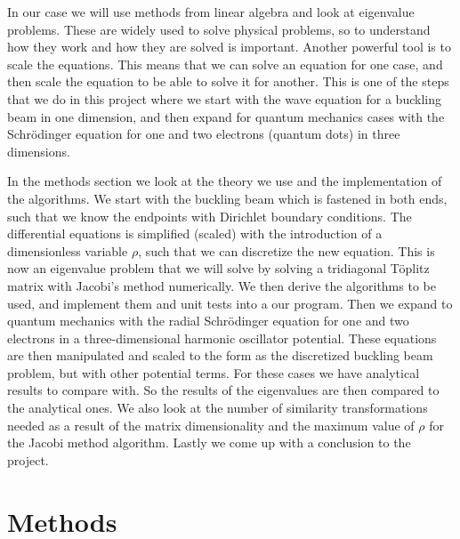 \documentclass[12pt,a4paper,english]{article}
\begin{document}
In our case we will use methods from linear algebra and look at eigenvalue problems. These are widely used to solve physical problems, so to understand how they work and how they are solved is important. Another powerful tool is to scale the equations. This means that we can solve an equation for one case, and then scale the equation to be able to solve it for another. This is one of the steps that we do in this project where we start with the wave equation for a buckling beam in one dimension, and then expand for quantum mechanics cases with the Schrödinger equation for one and two electrons (quantum dots) in three dimensions.

In the methods section we look at the theory we use and the implementation of the algorithms. We start with the buckling beam which is fastened in both ends, such that we know the endpoints with Dirichlet boundary conditions. The differential equations is simplified (scaled) with the introduction of a dimensionless variable $\rho$, such that we can discretize the new equation. This is now an eigenvalue problem that we will solve by solving a tridiagonal Töplitz matrix with Jacobi's method numerically. We then derive the algorithms to be used, and implement them and unit tests into a our program. Then we expand to quantum mechanics with the radial Schrödinger equation for one and two electrons in a three-dimensional harmonic oscillator potential. These equations are then manipulated and scaled to the form as the discretized buckling beam problem, but with other potential terms. For these cases we have analytical results to compare with. So the results of the eigenvalues are then compared to the analytical ones. We also look at the number of similarity transformations needed as a result of the matrix dimensionality and the maximum value of $\rho$ for the Jacobi method algorithm. Lastly we come up with a conclusion to the project.

\section{Methods}
\end{document}
